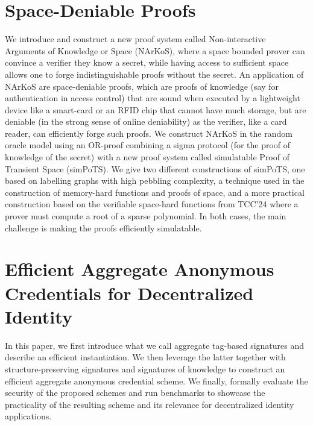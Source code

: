 \documentclass[11pt,oneside]{book}
\theoremstyle{definition}
\theoremstyle{remark}
\theoremstyle{plain}
\begin{document}
\section{\cite{cryptoeprint:2025/1723} Space-Deniable Proofs}
We introduce and construct a new proof system called Non-interactive Arguments of Knowledge or Space (NArKoS), where a space bounded prover can convince a verifier they know a secret, while having access to sufficient space allows one to forge indistinguishable proofs without the secret. An application of NArKoS are space-deniable proofs, which are proofs of knowledge (say for authentication in access control) that are sound when executed by a lightweight device like a smart-card or an RFID chip that cannot have much storage, but are deniable (in the strong sense of online deniability) as the verifier, like a card reader, can efficiently forge such proofs. We construct NArKoS in the random oracle model using an OR-proof combining a sigma protocol (for the proof of knowledge of the secret) with a new proof system called simulatable Proof of Transient Space (simPoTS). We give two different constructions of simPoTS, one based on labelling graphs with high pebbling complexity, a technique used in the construction of memory-hard functions and proofs of space, and a more practical construction based on the verifiable space-hard functions from TCC'24 where a prover must compute a root of a sparse polynomial. In both cases, the main challenge is making the proofs efficiently simulatable.

\section{\cite{cryptoeprint:2025/1724} Efficient Aggregate Anonymous Credentials for Decentralized Identity}
In this paper, we first introduce what we call aggregate tag-based signatures and describe an efficient instantiation. We then leverage the latter together with structure-preserving signatures and signatures of knowledge to construct an efficient aggregate anonymous credential scheme. We finally, formally evaluate the security of the proposed schemes and run benchmarks to showcase the practicality of the resulting scheme and its relevance for decentralized identity applications.
\end{document}
